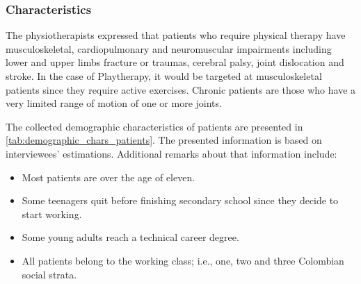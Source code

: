 \subsubsection{Characteristics}
The physiotherapists expressed that patients who require physical therapy have musculoskeletal, cardiopulmonary and neuromuscular impairments including lower and upper limbs fracture or traumas, cerebral palsy, joint dislocation and stroke. In the case of Playtherapy, it would be targeted at musculoskeletal patients since they require active exercises. Chronic patients are those who have a very limited range of motion of one or more joints.

The collected demographic characteristics of patients are presented in \autoref{tab:demographic_chars_patients}. The presented information is based on interviewees' estimations. Additional remarks about that information include:

\begin{itemize}
    \item Most patients are over the age of eleven.
    \item Some teenagers quit before finishing secondary school since they decide to start working.
    \item Some young adults reach a technical career degree.
    \item All patients belong to the working class; i.e., one, two and three Colombian social strata.
\end{itemize}

\begin{table}[bth]
\caption{Demographic characteristics of patients treated at physical medicine and rehabilitation unit of the hospital}
\myfloatalign
{}
\label{tab:demographic_chars_patients}
\end{table}

